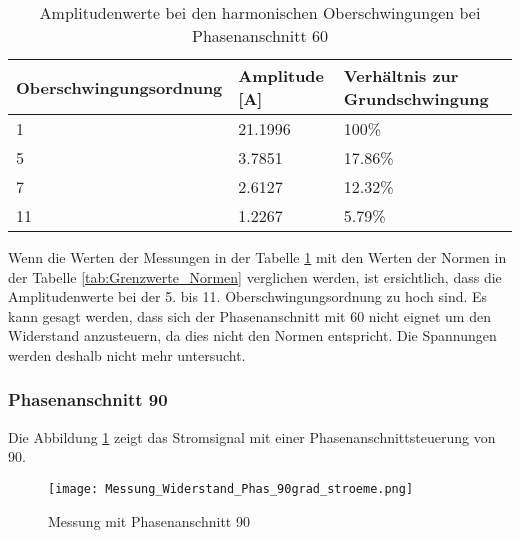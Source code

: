 \begin{table}[ht!]
	\centering
	\begin{tabular}{|l|l|l|}
		\hline
		Oberschwingungsordnung & Amplitude [A] 	& Verhältnis zur Grundschwingung	\\ \hline
		1                      & 21.1996   		& 100\%								\\ \hline
		5                      & 3.7851    		& 17.86\%							\\ \hline
		7                      & 2.6127    		& 12.32\%							\\ \hline
		11                     & 1.2267    		& 5.79\%							\\ \hline
	\end{tabular}
	\caption{Amplitudenwerte bei den harmonischen Oberschwingungen bei Phasenanschnitt 60\textdegree}\label{tab:Phas_60_Stroeme}
\end{table}

Wenn die Werten der Messungen in der Tabelle \ref{tab:Phas_60_Stroeme} mit den Werten der Normen in der Tabelle \ref{tab:Grenzwerte_Normen} verglichen werden, ist ersichtlich, dass die Amplitudenwerte bei der 5. bis 11. Oberschwingungsordnung zu hoch sind. Es kann gesagt werden, dass sich der Phasenanschnitt mit 60\textdegree \hspace{0.02cm} nicht eignet um den Widerstand anzusteuern, da dies nicht den Normen entspricht. Die Spannungen werden deshalb nicht mehr untersucht. 


\subsubsection*{Phasenanschnitt 90\textdegree}

Die Abbildung \ref{fig:Mess_Widerstand_Phas_90grad_stroeme} zeigt das Stromsignal mit einer Phasenanschnittsteuerung von 90\textdegree \hspace{0.02cm}. 

\begin{figure}[ht!]
	\centering
	\texttt{[image: Messung\_Widerstand\_Phas\_90grad\_stroeme.png]}	
	\caption{Messung mit Phasenanschnitt 90\textdegree}\label{fig:Mess_Widerstand_Phas_90grad_stroeme}
\end{figure}

